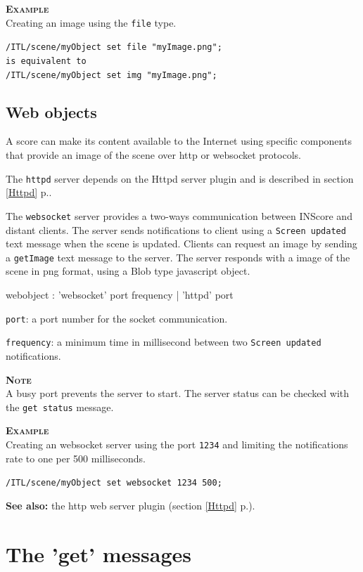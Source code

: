 \documentclass[a4paper,twoside]{report}
\newcommand{\toplevel}[1]	{\chapter{#1}}
\newcommand{\sublevel}[1]	{\section{#1}}
\newcommand{\fullref}[1]	{\ref{#1} p.\pageref{#1}}
\newcommand{\OSC}[1]		{\texttt{#1}}
\newcommand{\example}		{\textbf{\hspace{-1.5cm}\textbf{\textsc{Example }}}}
\newcommand{\note}	[1]		{\vspace{2mm}\textbf{\hspace{-0.9cm}\textbf{\textsc{Note #1}}}}
\renewcommand{\seealso}		{\textbf{See also: }}
\let\olditemize\itemize
\let\oldenditemize\enditemize
\renewenvironment{itemize} 	{\olditemize \setlength{\itemsep}{1mm}}{\oldenditemize}
\newcommand{\sample}	[1]			{\vspace{-2mm}\begin{center}\colorbox{mygrey}{
								\begin{minipage}[t]{0.9\columnwidth} 
								{\small \texttt{#1}}
								\end{minipage}}\end{center}}
\begin{document}
\example \\
Creating an image using the \OSC{file} type.
\sample{/ITL/scene/myObject set file "myImage.png"; \\
\hspace*{4mm} is equivalent to \\
/ITL/scene/myObject set img "myImage.png";
}

\sublevel{Web objects}
\label{webobjects}

A score can make its content available to the Internet using specific components that provide an image of the scene over http or websocket protocols.

The \OSC{httpd} server depends on the Httpd server plugin and is described in section \fullref{Httpd}.

The \OSC{websocket} server provides a two-ways communication between INScore and distant clients. The server sends notifications to client using a \OSC{Screen updated} text message when the scene is updated. Clients can request an image by sending a \OSC{getImage} text message to the server. The server responds with a image of the scene in png format, using a Blob type javascript object.

\begin{rail}
webobject :   'websocket' port frequency
			| 'httpd' port
\end{rail}

\begin{itemize}
\item \OSC{port}: a port number for the socket communication.
\item \OSC{frequency}: a minimum time in millisecond between two \OSC{Screen updated} notifications.
\end{itemize}

\note{} \\
A busy port prevents the server to start. The server status can be checked with the \OSC{get status} message.

\example \\
Creating an websocket server using the port \OSC{1234} and limiting the notifications rate to one per 500 milliseconds.
\sample{/ITL/scene/myObject set websocket 1234 500;}

\seealso the http web server plugin (section \fullref{Httpd}).



\toplevel{The 'get' messages}
\label{getsect}
\end{document}
